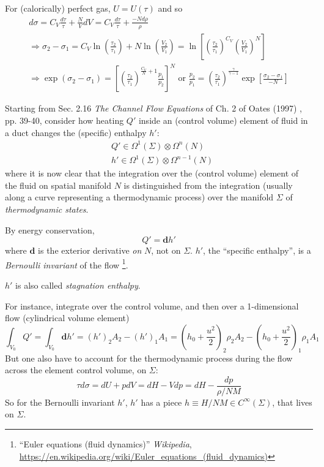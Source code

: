 \documentclass[10pt]{amsart}
\begin{document}
\begin{multicols*}{2}
For (calorically) perfect gas, $U=U(\tau)$ and so
\[
\begin{gathered}
  d\sigma = C_V \frac{d\tau}{\tau} + \frac{N}{V} dV = C_V \frac{d\tau}{\tau} + \frac{-Nd\rho }{\rho} \\
  \Longrightarrow \sigma_2 - \sigma_1 = C_V \ln{ \left( \frac{\tau_2}{\tau_1} \right) } + N \ln{ \left( \frac{V_2}{V_1} \right)} = \ln{ \left[ \left( \frac{\tau_2}{\tau_1} \right)^{C_V} \left( \frac{V_2}{V_1} \right)^N \right] } \\
  \Longrightarrow \exp{ ( \sigma_2 - \sigma_1) } = \left[ \left( \frac{\tau_2}{\tau_1} \right)^{ \frac{C_V}{N} + 1 } \frac{p_1}{p_2} \right]^{N} \text{ or } \frac{p_2}{p_1} = \left( \frac{\tau_2}{\tau_1} \right)^{\frac{\gamma}{\gamma-1}} \exp{ \left[ \frac{\sigma_2-\sigma_1}{-N} \right] }
\end{gathered}
\]

Starting from Sec. 2.16 \emph{The Channel Flow Equations} of Ch. 2 of Oates (1997) \cite{GOates1997}, pp. 39-40, consider how heating $Q'$ inside an (control volume) element of fluid in a duct changes the (specific) enthalpy $h'$:
\[
\begin{aligned}
  & Q' \in \Omega^1(\Sigma) \otimes \Omega^n(N) \\ 
  & h' \in \Omega^1(\Sigma) \otimes \Omega^{n-1}(N)
\end{aligned}
\]
where it is now clear that the integration over the (control volume) element of the fluid on spatial manifold $N$ is distinguished from the integration (usually along a curve representing a thermodynamic process) over the manifold $\Sigma$ of \emph{thermodynamic states}.  

By energy conservation, 
\[
Q' = \mathbf{d}h'
\]
 where $\mathbf{d}$ is the exterior derivative \emph{on} $N$, not on $\Sigma$.  $h'$, the ``specific enthalpy'', is a \emph{Bernoulli invariant} of the flow \footnote{``Euler equations (fluid dynamics)'' \emph{Wikipedia}, \url{https://en.wikipedia.org/wiki/Euler_equations_(fluid_dynamics)}}.  

$h'$ is also called \emph{stagnation enthalpy}.  

For instance, integrate over the control volume, and then over a 1-dimensional flow (cylindrical volume element)
\[
\int_{V_0} Q' = \int_{V_0} \mathbf{d}h' = (h')_2 A_2 - (h')_1A_1 = (h_0+\frac{u^2}{2})_2 \rho_2 A_2 - (h_0 + \frac{u^2}{2})_1 \rho_1 A_1
\]
But one also have to account for the thermodynamic process during the flow across the element control volume, on $\Sigma$:
\[
\tau d\sigma = dU + pdV = dH - Vdp = dH - \frac{dp}{\rho/NM}
\]
So for the Bernoulli invariant $h'$, $h'$ has a piece $h \equiv H/NM \in C^{\infty}(\Sigma)$, that lives on $\Sigma$.  


\end{multicols*}
\end{document}

